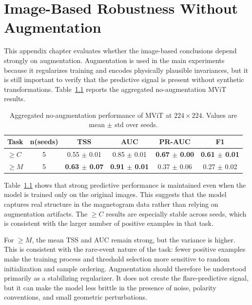 \FloatBarrier

\chapter{Image-Based Robustness Without Augmentation}
\label{app:no_aug_2d_mvit}

This appendix chapter evaluates whether the image-based conclusions depend strongly on augmentation. Augmentation is used in the main experiments because it regularizes training and encodes physically plausible invariances, but it is still important to verify that the predictive signal is present without synthetic transformations. Table~\ref{tab:appendix_no_aug} reports the aggregated no-augmentation MViT results.

\begin{table}[!htbp]
\centering
\footnotesize
\caption{Aggregated no-augmentation performance of MViT at $224\times224$. Values are mean $\pm$ std over seeds.}
\label{tab:appendix_no_aug}
\begin{tabular}{lccccc}
\toprule
Task & n(seeds) & TSS & AUC & PR-AUC & F1 \\
\midrule
$\geq C$ & 5 & 0.55 $\pm$ 0.01 & 0.85 $\pm$ 0.01 & \textbf{0.67 $\pm$ 0.00} & \textbf{0.61 $\pm$ 0.01} \\
$\geq M$ & 5 & \textbf{0.63 $\pm$ 0.07} & \textbf{0.91 $\pm$ 0.01} & 0.37 $\pm$ 0.06 & 0.27 $\pm$ 0.02 \\
\bottomrule
\end{tabular}
\end{table}

\FloatBarrier

Table~\ref{tab:appendix_no_aug} shows that strong predictive performance is maintained even when the model is trained only on the original images. This suggests that the model captures real structure in the magnetogram data rather than relying on augmentation artifacts. The $\geq C$ results are especially stable across seeds, which is consistent with the larger number of positive examples in that task.

For $\geq M$, the mean TSS and AUC remain strong, but the variance is higher. This is consistent with the rare-event nature of the task: fewer positive examples make the training process and threshold selection more sensitive to random initialization and sample ordering. Augmentation should therefore be understood primarily as a stabilizing regularizer. It does not create the flare-predictive signal, but it can make the model less brittle in the presence of noise, polarity conventions, and small geometric perturbations.

